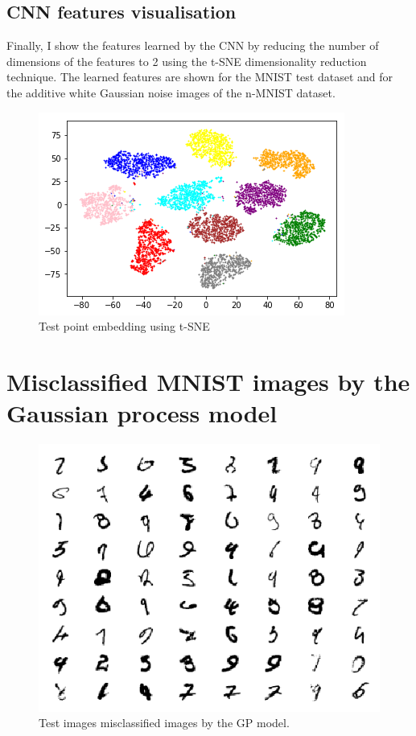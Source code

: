 \documentclass{article}
\begin{document}
\subsection{CNN features visualisation}
Finally, I show the features learned by the CNN by reducing the number of dimensions of the features to 2 using the t-SNE \cite{maaten2008visualizing} dimensionality reduction technique. The learned features are shown for the MNIST test dataset and for the additive white Gaussian noise images of the n-MNIST dataset.

\begin{figure}[H]
	\centering
	\includegraphics[scale=0.5]{embeddings_visualisation.png}
	\caption{Test point embedding using t-SNE}
\end{figure}

\small




\newpage
\appendix 
\section{Misclassified MNIST images by the Gaussian process model}
\label{appendix/mnist_error}

\begin{figure}[h]
	\centering
	\includegraphics[scale=1.1]{incorrect_mnist}
	\caption{Test images misclassified images by the GP model.}
	\label{fig/incorrect_mnist}
\end{figure}
\end{document}
